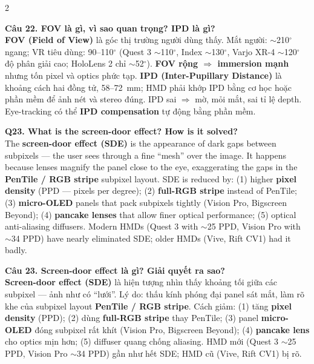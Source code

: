 \begin{paracol}{2}
\switchcolumn

\textbf{Câu 22. FOV là gì, vì sao quan trọng? IPD là gì?}\\
\textbf{FOV (Field of View)} là góc thị trường người dùng thấy. Mắt người: $\sim$210$^\circ$ ngang; VR tiêu dùng: 90--110$^\circ$ (Quest 3 $\sim$110$^\circ$, Index $\sim$130$^\circ$, Varjo XR-4 $\sim$120$^\circ$ độ phân giải cao; HoloLens 2 chỉ $\sim$52$^\circ$). \textbf{FOV rộng $\Rightarrow$ immersion mạnh} nhưng tốn pixel và optics phức tạp. \textbf{IPD (Inter-Pupillary Distance)} là khoảng cách hai đồng tử, 58--72~mm; HMD phải khớp IPD bằng cơ học hoặc phần mềm để ảnh nét và stereo đúng. IPD sai $\Rightarrow$ mờ, mỏi mắt, sai tỉ lệ depth. Eye-tracking có thể \textbf{IPD compensation} tự động bằng phần mềm.

\switchcolumn*

\textbf{Q23. What is the screen-door effect? How is it solved?}\\
The \textbf{screen-door effect (SDE)} is the appearance of dark gaps between subpixels --- the user sees through a fine ``mesh'' over the image. It happens because lenses magnify the panel close to the eye, exaggerating the gaps in the \textbf{PenTile / RGB stripe} subpixel layout. SDE is reduced by: (1) higher \textbf{pixel density} (PPD --- pixels per degree); (2) \textbf{full-RGB stripe} instead of PenTile; (3) \textbf{micro-OLED} panels that pack subpixels tightly (Vision Pro, Bigscreen Beyond); (4) \textbf{pancake lenses} that allow finer optical performance; (5) optical anti-aliasing diffusers. Modern HMDs (Quest 3 with $\sim$25 PPD, Vision Pro with $\sim$34 PPD) have nearly eliminated SDE; older HMDs (Vive, Rift CV1) had it badly.

\switchcolumn

\textbf{Câu 23. Screen-door effect là gì? Giải quyết ra sao?}\\
\textbf{Screen-door effect (SDE)} là hiện tượng nhìn thấy khoảng tối giữa các subpixel --- ảnh như có ``lưới''. Lý do: thấu kính phóng đại panel sát mắt, làm rõ khe của subpixel layout \textbf{PenTile / RGB stripe}. Cách giảm: (1) tăng \textbf{pixel density} (PPD); (2) dùng \textbf{full-RGB stripe} thay PenTile; (3) panel \textbf{micro-OLED} đóng subpixel rất khít (Vision Pro, Bigscreen Beyond); (4) \textbf{pancake lens} cho optics mịn hơn; (5) diffuser quang chống aliasing. HMD mới (Quest 3 $\sim$25 PPD, Vision Pro $\sim$34 PPD) gần như hết SDE; HMD cũ (Vive, Rift CV1) bị rõ.

\switchcolumn*


\end{paracol}
